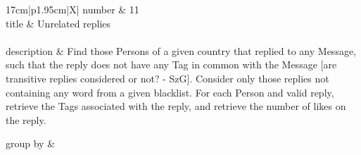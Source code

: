 \renewcommand*{\arraystretch}{1.5}
\noindent\begin{tabularx}{17cm}{|p{1.95cm}|X|}
	\hline
	number      & 11                                                          \\ \hline
	title       & Unrelated replies                                                           \\ \hline
	 \\ \hline
	description & Find those Persons of a given country that replied to any Message, such
that the reply does not have any Tag in common with the Message {[}are
transitive replies considered or not? - SzG{]}. Consider only those
replies not containing any word from a given blacklist. For each Person
and valid reply, retrieve the Tags associated with the reply, and
retrieve the number of likes on the reply.
 \\ \hline
	
	group by       &
	\\ \hline
	

\end{tabularx}
